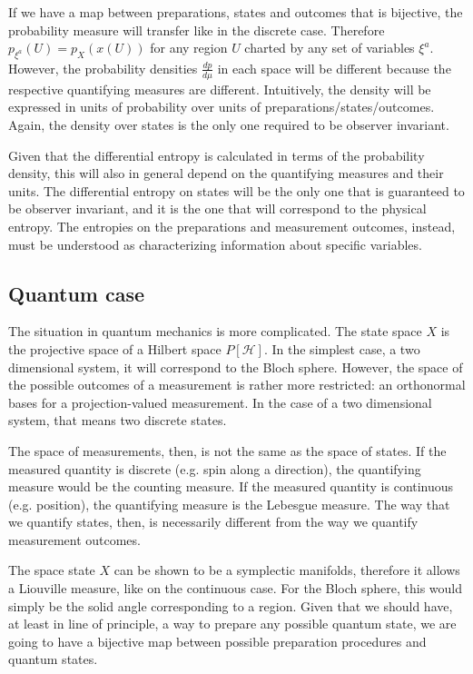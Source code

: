 \documentclass[10pt,twocolumn, nofootinbib]{revtex4-2}
\begin{document}
If we have a map between preparations, states and outcomes that is bijective, the probability measure will transfer like in the discrete case. Therefore $p_{\xi^a}(U) = p_X(x(U))$ for any region $U$ charted by any set of variables $\xi^a$. However, the probability densities $\frac{dp}{d\mu}$ in each space will be different because the respective quantifying measures are different. Intuitively, the density will be expressed in units of probability over units of preparations/states/outcomes. Again, the density over states is the only one required to be observer invariant.

Given that the differential entropy is calculated in terms of the probability density, this will also in general depend on the quantifying measures and their units. The differential entropy on states will be the only one that is guaranteed to be observer invariant, and it is the one that will correspond to the physical entropy. The entropies on the preparations and measurement outcomes, instead, must be understood as characterizing information about specific variables.

\subsection{Quantum case}

The situation in quantum mechanics is more complicated. The state space $X$ is the projective space of a Hilbert space $P[\mathcal{H}]$. In the simplest case, a two dimensional system, it will correspond to the Bloch sphere. However, the space of the possible outcomes of a measurement is rather more restricted: an orthonormal bases for a projection-valued measurement. In the case of a two dimensional system, that means two discrete states.

The space of measurements, then, is not the same as the space of states. If the measured quantity is discrete (e.g. spin along a direction), the quantifying measure would be the counting measure. If the measured quantity is continuous (e.g. position), the quantifying measure is the Lebesgue measure. The way that we quantify states, then, is necessarily different from the way we quantify measurement outcomes.

The space state $X$ can be shown to be a symplectic manifolds, therefore it allows a Liouville measure, like on the continuous case. For the Bloch sphere, this would simply be the solid angle corresponding to a region. Given that we should have, at least in line of principle, a way to prepare any possible quantum state, we are going to have a bijective map between possible preparation procedures and quantum states. 
\end{document}
